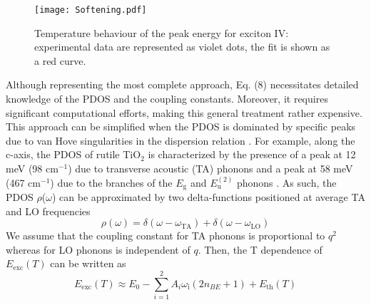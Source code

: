\documentclass[aps,prl,twocolumn,amsfonts,nobibnotes,superscriptaddress,showpacs]{revtex4-1}
\begin{document}
\begin{figure}[t]
	\begin{center}
		\texttt{[image: Softening.pdf]}
		\caption{Temperature behaviour of the peak energy for exciton IV: experimental data are represented as violet dots, the fit is shown as a red curve.}
		\label{fig:Softening}
	\end{center}
\end{figure}

Although representing the most complete approach, Eq. (8) necessitates detailed knowledge of the PDOS and the coupling constants. Moreover, it requires significant computational efforts, making this general treatment rather expensive. This approach can be simplified when the PDOS is dominated by specific peaks due to van Hove singularities in the dispersion relation \cite{cardona2014temperature}. For example, along the c-axis, the PDOS of rutile TiO$_2$ is characterized by the presence of a peak at 12 meV (98 cm$^{-1}$) due to transverse acoustic (TA) phonons and a peak at 58 meV (467 cm$^{-1}$) due to the branches of the $E\mathrm{_g}$ and $E\mathrm{_u^{(2)}}$ phonons \cite{sikora2005ab}. As such, the PDOS $\rho$($\omega$) can be approximated by two delta-functions positioned at average TA and LO frequencies
\begin{equation}
\rho(\omega) = \delta(\omega-\omega_\mathrm{{TA}}) + \delta(\omega-\omega_\mathrm{{LO}})
\end{equation}
We assume that the coupling constant for TA phonons is  proportional to $q^2$ whereas for LO phonons is independent of $q$. Then, the T dependence of $E\mathrm{_{exc}}(T)$ can be written as
\begin{equation}
E\mathrm{_{exc}}(T) \approx E_0 - \sum_{i = 1}^2 A_i \omega_\mathrm{i} (2n_{BE} + 1) + E\mathrm{_{th}}(T)
\end{equation}
\end{document}
